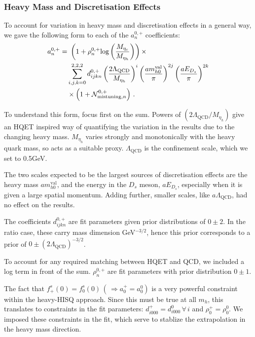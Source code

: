 \subsubsection{Heavy Mass and Discretisation Effects}

To account for variation in heavy mass and discretisation effects in a general way, we gave the following form to each of the $a_n^{0,+}$ coefficients:
\begin{align}
  \nonumber  a_n^{0,+} = & \,\,\left( 1 + \rho^{0,+}_n \text{log}\left(M_{\eta_c}\over M_{\eta_h}\right)\right) \times \\ \nonumber
  &\sum_{i,j,k = 0}^{2,2,2} d^{0,+}_{ijkn} \left({2\Lambda_{\text{QCD}}\over M_{\eta_h} }\right)^{i} \left({ am^{\text{val}}_{h0} \over \pi }\right)^{2j} \left({ aE_{D_s} \over \pi }\right)^{2k} \\ &\times\left(1 + \mathcal{N}_{\text{mistuning},n}^{0,+} \right)\,.
      \label{eq:mhfitfun}
\end{align}

To understand this form, focus first on the sum. Powers of $(2\Lambda_{\text{QCD}}/M_{\eta_h})$ give an HQET inspired way of quantifying the variation in the results due to the changing heavy mass. $M_{\eta_h}$ varies strongly and monotonically with the heavy quark mass, so acts as a suitable proxy. $\Lambda_{\text{QCD}}$ is the confinement scale, which we set to 0.5GeV.

The two scales expected to be the largest sources of discretisation effects are the heavy mass $am_{h0}^{\text{val}}$, and the energy in the $D_s$ meson, $aE_{D_s}$, especially when it is given a large spatial momentum. Adding further, smaller scales, like $a\Lambda_{\text{QCD}}$, had no effect on the results.

The coefficients $d^{0,+}_{ijkn}$ are fit parameters given prior distributions of $0\pm 2$. In the ratio case, these carry mass dimension GeV$^{-3/2}$, hence this prior corresponds to a prior of $0\pm (2\Lambda_{\text{QCD}})^{-3/2}$.

To account for any required matching between HQET and QCD, we included a log term in front of the sum. $\rho^{0,+}_n$ are fit parameters with prior distribution $0\pm 1$.

The fact that $f^s_+(0) = f^s_0(0) \,(\,\Rightarrow a^+_0 = a^0_0)$ is a very powerful constraint within the heavy-HISQ approach. Since this must be true at all $m_h$, this translates to constraints in the fit parameters: $d^+_{i000}=d^0_{i000} \,\forall \,i$ and $\rho^+_0 = \rho^0_0$. We imposed these constraints in the fit, which serve to stablize the extrapolation in the heavy mass direction.

